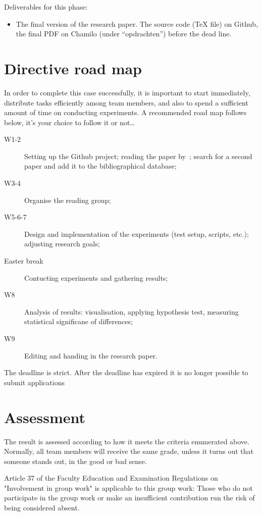 \documentclass[fleqn,10pt]{artikeltin}
\begin{document}
Deliverables for this phase:

\begin{itemize}
	\item The final version of the research paper. The source code (TeX file) on Github, the final PDF on Chamilo (under ``opdrachten'') before the dead line. 
\end{itemize}

\section{Directive road map}
\label{sec:roadmap}

In order to complete this case successfully, it is important to start immediately, distribute tasks efficiently among team members, and also to spend a sufficient amount of time on conducting experiments. A recommended road map follows below, it's your choice to follow it or not\ldots

\begin{description}
	\item[W1-2] Setting up the Github project; reading the paper by~\textcite{Bassil2012}; search for a second paper and add it to the bibliographical database;
	\item[W3-4] Organise the reading group;
	\item[W5-6-7] Design and implementation of the experiments (test setup, scripts, etc.); adjusting research goals;
	\item[Easter break] Contucting experiments and gathering results;
	\item[W8] Analysis of results: visualisation, applying hypothesis test, measuring statistical significane of differences;
	\item[W9] Editing and handing in the research paper.
\end{description}
The deadline is strict. After the deadline has expired
it is no longer possible to submit applications
\section{Assessment}

The result is assessed according to how it meets the criteria enumerated above. Normally, all team members will receive the same grade, unless it turns out that someone stands out, in the good or bad sense. 

Article 37 of the Faculty Education and Examination Regulations on "Involvement in group work" is applicable to this group work: Those who do not participate in the group work or make an insufficient contribution run the risk of being considered absent. 
\end{document}
